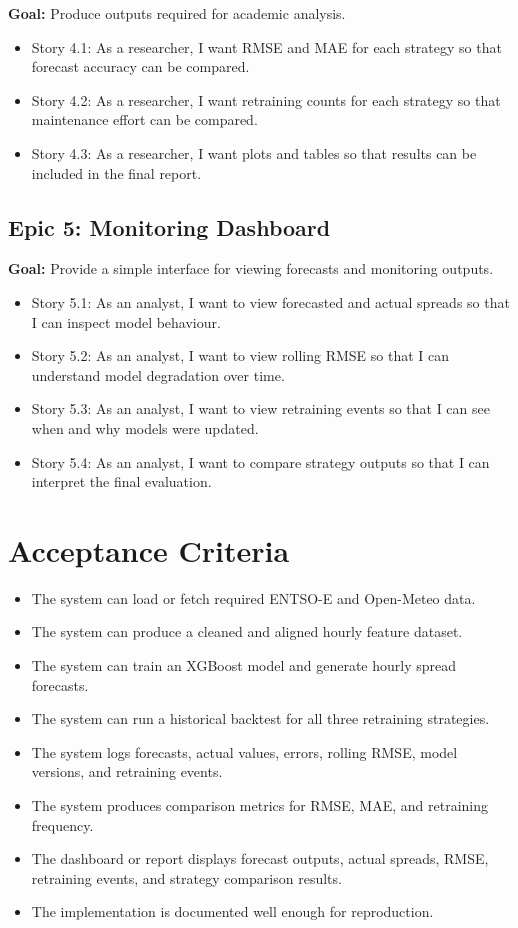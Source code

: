 \documentclass[12pt,a4paper]{article}
\begin{document}
\textbf{Goal:} Produce outputs required for academic analysis.

\begin{itemize}
    \item Story 4.1: As a researcher, I want RMSE and MAE for each strategy so that forecast accuracy can be compared.
    \item Story 4.2: As a researcher, I want retraining counts for each strategy so that maintenance effort can be compared.
    \item Story 4.3: As a researcher, I want plots and tables so that results can be included in the final report.
\end{itemize}

\subsection{Epic 5: Monitoring Dashboard}

\textbf{Goal:} Provide a simple interface for viewing forecasts and monitoring outputs.

\begin{itemize}
    \item Story 5.1: As an analyst, I want to view forecasted and actual spreads so that I can inspect model behaviour.
    \item Story 5.2: As an analyst, I want to view rolling RMSE so that I can understand model degradation over time.
    \item Story 5.3: As an analyst, I want to view retraining events so that I can see when and why models were updated.
    \item Story 5.4: As an analyst, I want to compare strategy outputs so that I can interpret the final evaluation.
\end{itemize}

\section{Acceptance Criteria}

\begin{itemize}
    \item The system can load or fetch required ENTSO-E and Open-Meteo data.
    \item The system can produce a cleaned and aligned hourly feature dataset.
    \item The system can train an XGBoost model and generate hourly spread forecasts.
    \item The system can run a historical backtest for all three retraining strategies.
    \item The system logs forecasts, actual values, errors, rolling RMSE, model versions, and retraining events.
    \item The system produces comparison metrics for RMSE, MAE, and retraining frequency.
    \item The dashboard or report displays forecast outputs, actual spreads, RMSE, retraining events, and strategy comparison results.
    \item The implementation is documented well enough for reproduction.
\end{itemize}
\end{document}
